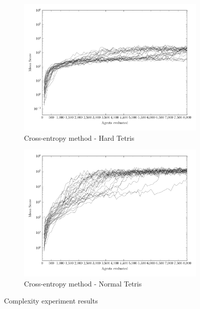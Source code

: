 \begin{figure}
\begin{subfigure}[b]{0.49\textwidth}
    	\caption{Cross-entropy method - Hard Tetris}
        \includegraphics[width=\textwidth]{data/complexity/ce_hard/PlotFile.pdf}
    \end{subfigure}
    \begin{subfigure}[b]{0.49\textwidth}
    	\caption{Cross-entropy method - Normal Tetris}
        \includegraphics[width=\textwidth]{data/complexity/ce_normal/PlotFile.pdf}
    \end{subfigure}
    
    \caption{Complexity experiment results}
\end{figure}


